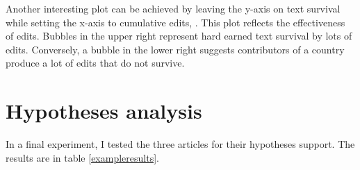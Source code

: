 Another interesting plot can be achieved by leaving the y-axis on text survival while setting the x-axis to cumulative edits, .
This plot reflects the effectiveness of edits. 
Bubbles in the upper right represent hard earned text survival by lots of edits.
Conversely, a bubble in the lower right suggests contributors of a country produce a lot of edits that do not survive.

\section{Hypotheses analysis}

In a final experiment, I tested the three articles for their hypotheses support.
The results are in table \ref{exampleresults}.

